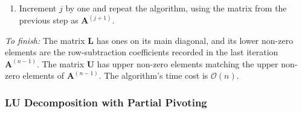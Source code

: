 \documentclass[11pt, a4paper]{article}
\newcommand{\mat}[1]{\mathbf{#1}} %
\begin{document}
\begin{itemize}
\begin{enumerate}
		\item Increment $ j $ by one and repeat the algorithm, using the matrix from the previous step as $ \mat{A}^{(j+1)} $.
	\end{enumerate}
	\textit{To finish:} The matrix $ \mat{L} $ has ones on its main diagonal, and its lower non-zero elements are the row-subtraction coefficients recorded in the last iteration $ \mat{A}^{(n-1)} $. The matrix $ \mat{U} $ has upper non-zero elements matching the upper non-zero elements of $ \mat{A}^{(n-1)} $. The algorithm's time cost is $ \mathcal{O}(n) $.
	
	
	

\end{itemize}




\subsubsection{LU Decomposition with Partial Pivoting}
\end{document}

